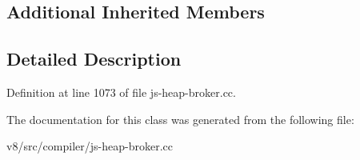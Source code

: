 \subsection*{Additional Inherited Members}


\subsection{Detailed Description}


Definition at line 1073 of file js-\/heap-\/broker.\+cc.



The documentation for this class was generated from the following file\+:\begin{DoxyCompactItemize}
\item 
v8/src/compiler/js-\/heap-\/broker.\+cc\end{DoxyCompactItemize}
